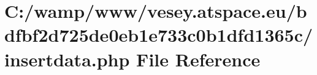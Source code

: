 \hypertarget{bdfbf2d725de0eb1e733c0b1dfd1365c_2insertdata_8php}{\section{C\-:/wamp/www/vesey.atspace.\-eu/bdfbf2d725de0eb1e733c0b1dfd1365c/insertdata.php File Reference}
\label{bdfbf2d725de0eb1e733c0b1dfd1365c_2insertdata_8php}
}
